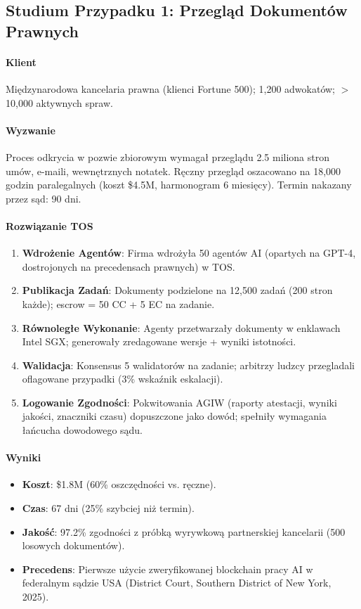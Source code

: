 \documentclass[11pt]{article}
\begin{document}
\subsection{Studium Przypadku 1: Przegląd Dokumentów Prawnych}

\paragraph{Klient} Międzynarodowa kancelaria prawna (klienci Fortune 500); 1,200 adwokatów; $>$10,000 aktywnych spraw.

\paragraph{Wyzwanie} Proces odkrycia w pozwie zbiorowym wymagał przeglądu 2.5 miliona stron umów, e-maili, wewnętrznych notatek. Ręczny przegląd oszacowano na 18,000 godzin paralegalnych (koszt \$4.5M, harmonogram 6 miesięcy). Termin nakazany przez sąd: 90 dni.

\paragraph{Rozwiązanie TOS}
\begin{enumerate}[noitemsep]
  \item \textbf{Wdrożenie Agentów}: Firma wdrożyła 50 agentów AI (opartych na GPT-4, dostrojonych na precedensach prawnych) w TOS.
  \item \textbf{Publikacja Zadań}: Dokumenty podzielone na 12,500 zadań (200 stron każde); escrow = 50 CC + 5 EC na zadanie.
  \item \textbf{Równoległe Wykonanie}: Agenty przetwarzały dokumenty w enklawach Intel SGX; generowały zredagowane wersje + wyniki istotności.
  \item \textbf{Walidacja}: Konsensus 5 walidatorów na zadanie; arbitrzy ludzcy przegladali oflagowane przypadki (3\% wskaźnik eskalacji).
  \item \textbf{Logowanie Zgodności}: Pokwitowania AGIW (raporty atestacji, wyniki jakości, znaczniki czasu) dopuszczone jako dowód; spełniły wymagania łańcucha dowodowego sądu.
\end{enumerate}

\paragraph{Wyniki}
\begin{itemize}[noitemsep]
  \item \textbf{Koszt}: \$1.8M (60\% oszczędności vs. ręczne).
  \item \textbf{Czas}: 67 dni (25\% szybciej niż termin).
  \item \textbf{Jakość}: 97.2\% zgodności z próbką wyrywkową partnerskiej kancelarii (500 losowych dokumentów).
  \item \textbf{Precedens}: Pierwsze użycie zweryfikowanej blockchain pracy AI w federalnym sądzie USA (District Court, Southern District of New York, 2025).
\end{itemize}
\end{document}
